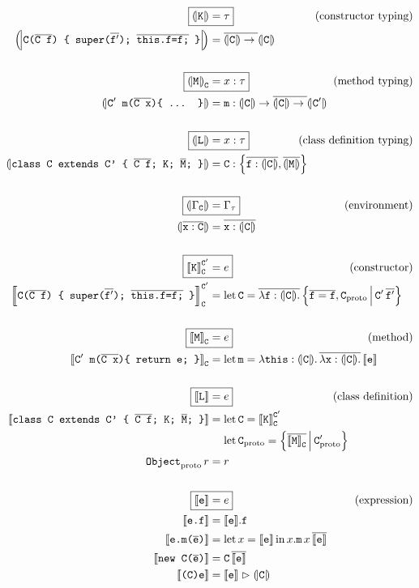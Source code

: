 \begin{align*}    
    \Aboxed{\denoty{\fj K} &= \tau} & \makebox[0mm][r]{(constructor typing)} \\
    \denoty{\fjconsdef} &= \overline{\denoty{\fj C} \to {}} \denoty{\fj{C}} \\
    \\
    \Aboxed{\denoty{\fj M}_{\fj C} &= x : \tau} & \makebox[0mm][r]{(method typing)} \\
    \denoty{\fjmethdefx} &= \fj m : \denoty{\fj C} \to \overline{\denoty{\fj C} \to {}} \denoty{\fj{C}'} \\
    \\
    \Aboxed{\denoty{\fj L} &= x : \tau} & \makebox[0mm][r]{(class definition typing)} \\
    \denoty{\fjclassdef} &= \fj C : \flrec{\overline{\fj{f}: \denoty{\fj{C}}}, \overline{\denoty{\fj M}}} \\
    \\
    \Aboxed{\denoty{\Gamma_{\fj C}} &= \Gamma_\tau} & \makebox[0mm][r]{(environment)} \\
    \denoty{\overline{\fj x : \fj C}} &= \overline{\fj x : \denoty{\fj C}} \\
    \\
    \Aboxed{\denot{\fj K}_{\fj{C}}^{\fj{C}'} &= e}  & \makebox[0mm][r]{(constructor)} \\
    \denot{\fjconsdef}_{\fj{C}}^{\fj{C}'} &= \flletx{\fj C}{\overline{\fllam{\fj f : \denoty{\fj C}}}\, \flext{\overline{\fj{f} = \fj{f}}, \fj C_\mathrm{proto}}{\fj{C}'\,\overline{\fj{f}'}}}
    \\ \\
    \Aboxed{\denot{\fj M}_{\fj C} &= e} & \makebox[0mm][r]{(method)} \\
    \denot{\fjmethdef}_{\fj C} &= \flletx{\fj m}{\fllam{\fj{this} : \denoty{\fj C}} \overline{\fllam{\fj x: \denoty{\fj C}}}\, \denot{\fj e}}
    \\ \\
    \Aboxed{\denot{\fj L} &= e} & \makebox[0mm][r]{(class definition)} \\
    \denot{\fjclassdef} &= \flletx{\fj C}{\denot{\fj K}_{\fj C}^{\fj C'}} \\
    &\phantom{{}={}} \flletx{\fj{C}_\mathrm{proto}}{\flext{\overline{\denot{\fj M}_{\fj C}}}{\fj C'_\mathrm{proto}}} \\
    \fj{Object}_\mathrm{proto}\,r &= r
    \\ \\
    \Aboxed{\denot{\fj e} &= e} & \makebox[0mm][r]{(expression)} \\
    \denot{\fj {e.f}} &= \flproj{\denot{\fj e}}{\fj f} \\
    \denot{\fj {e.m(\fjoverline e)}} &= \fllet{x}{\denot{\fj e}} \flproj{x}{\fj m}\,x\,\overline{\denot{\fj e}} \\
    \denot{\fj {new C(\fjoverline e)}} &= \fj{C}\,\overline{\denot{\fj e}} \\
    \denot{\fj {(C)e}} &= \flcast{\denot {\fj e}}{\denoty {\fj C}} 
\end{align*}